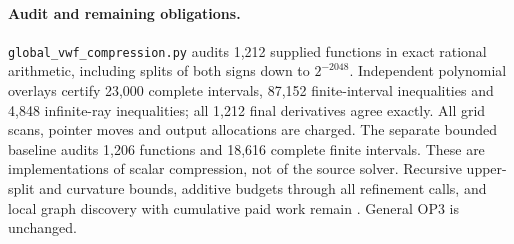 \paragraph{Audit and remaining obligations.}
\texttt{global\_vwf\_compression.py} audits 1,212 supplied functions in
exact rational arithmetic, including splits of both signs down to
$2^{-2048}$. Independent polynomial overlays certify 23,000 complete
intervals, 87,152 finite-interval inequalities and 4,848 infinite-ray
inequalities; all 1,212 final derivatives agree exactly. All grid scans,
pointer moves and output allocations are charged. The separate bounded
baseline audits 1,206 functions and 18,616 complete finite intervals.
These are implementations of scalar compression, not of the source solver.
Recursive upper-split and curvature bounds, additive budgets through all
refinement calls, and local graph discovery with cumulative paid work
remain \statusopen. General OP3 is unchanged.
